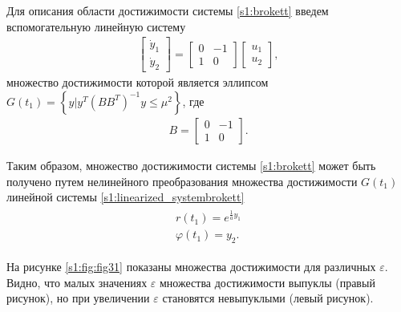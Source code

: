 \documentclass[../main.tex]{subfiles}
\begin{document}
Для описания области достижимости системы \eqref{s1:brokett} введем вспомогательную линейную систему
\begin{gather}\label{s1:linearized_systembrokett}
     \left[ {\begin{array}{*{20}{c}}
             {{{\dot y}_1}}\\
             {{{\dot y}_2}}
     \end{array}} \right] = \left[ {\begin{array}{*{20}{c}}
             0&{ - 1}\\
             1&0
     \end{array}} \right]\left[ {\begin{array}{*{20}{c}}
             {{u_1}}\\
             {{u_2}}
     \end{array}} \right],
\end{gather}
множество достижимости которой является эллипсом $ G(t_1) = \left\lbrace y | y^T \left( B B^T\right)  ^{-1} y \leqslant \mu^2 \right\rbrace  $, где 
\begin{gather*}
     B = \left[ {\begin{array}{*{20}{c}}
             0&{ - 1}\\
             1&0
     \end{array}} \right].
\end{gather*}
 
Таким образом, множество достижимости системы \eqref{s1:brokett} может быть получено путем нелинейного преобразования множества достижимости $ G(t_1) $ линейной системы \eqref{s1:linearized_systembrokett}
\begin{gather*}
	\begin{array}{l}
		r({t_1}) = {e^{ \frac{1}{a} y_1}}\\
		\varphi ({t_1}) =  y_2. 
	\end{array}
\end{gather*}

На рисунке  \ref{s1:fig:fig31} показаны множества достижимости для различных $ \varepsilon $.
Видно, что малых значениях $\varepsilon$ множества достижимости выпуклы (правый рисунок), но при увеличении $\varepsilon $ становятся невыпуклыми (левый рисунок).
\end{document}
